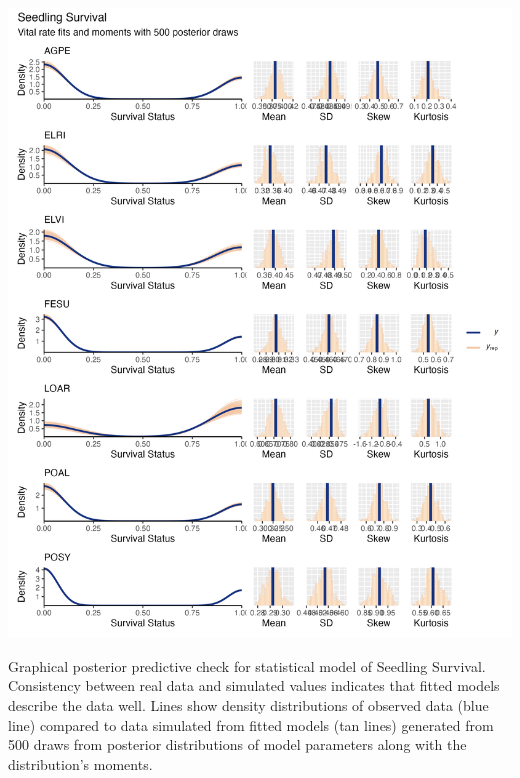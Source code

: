\documentclass[lineno, sn-basic]{sn-jnl}%
\begin{document}
\begin{myfigure}[H]
	\centering
	\includegraphics[width = \linewidth]{seedsurvbyspecies_densplot.png}
	\caption[Graphical posterior predictive check for statistical model of Seedling Survival]{Graphical posterior predictive check for statistical model of Seedling Survival. Consistency between real data and simulated values indicates that fitted models describe the data well. Lines show density distributions of observed data (blue line) compared to data simulated from fitted models (tan lines) generated from 500 draws from posterior distributions of model parameters along with the distribution's moments.}
\end{myfigure}
\end{document}
